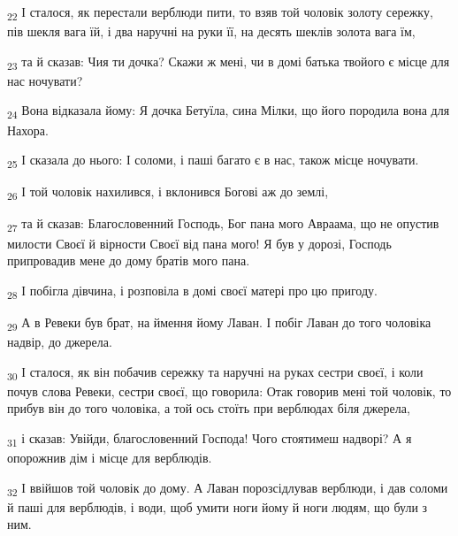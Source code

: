 \begin{tcolorbox}
\textsubscript{22} І сталося, як перестали верблюди пити, то взяв той чоловік золоту сережку, пів шекля вага їй, і два наручні на руки її, на десять шеклів золота вага їм,
\end{tcolorbox}
\begin{tcolorbox}
\textsubscript{23} та й сказав: Чия ти дочка? Скажи ж мені, чи в домі батька твойого є місце для нас ночувати?
\end{tcolorbox}
\begin{tcolorbox}
\textsubscript{24} Вона відказала йому: Я дочка Бетуїла, сина Мілки, що його породила вона для Нахора.
\end{tcolorbox}
\begin{tcolorbox}
\textsubscript{25} І сказала до нього: І соломи, і паші багато є в нас, також місце ночувати.
\end{tcolorbox}
\begin{tcolorbox}
\textsubscript{26} І той чоловік нахилився, і вклонився Богові аж до землі,
\end{tcolorbox}
\begin{tcolorbox}
\textsubscript{27} та й сказав: Благословенний Господь, Бог пана мого Авраама, що не опустив милости Своєї й вірности Своєї від пана мого! Я був у дорозі, Господь припровадив мене до дому братів мого пана.
\end{tcolorbox}
\begin{tcolorbox}
\textsubscript{28} І побігла дівчина, і розповіла в домі своєї матері про цю пригоду.
\end{tcolorbox}
\begin{tcolorbox}
\textsubscript{29} А в Ревеки був брат, на ймення йому Лаван. І побіг Лаван до того чоловіка надвір, до джерела.
\end{tcolorbox}
\begin{tcolorbox}
\textsubscript{30} І сталося, як він побачив сережку та наручні на руках сестри своєї, і коли почув слова Ревеки, сестри своєї, що говорила: Отак говорив мені той чоловік, то прибув він до того чоловіка, а той ось стоїть при верблюдах біля джерела,
\end{tcolorbox}
\begin{tcolorbox}
\textsubscript{31} і сказав: Увійди, благословенний Господа! Чого стоятимеш надворі? А я опорожнив дім і місце для верблюдів.
\end{tcolorbox}
\begin{tcolorbox}
\textsubscript{32} І ввійшов той чоловік до дому. А Лаван порозсідлував верблюди, і дав соломи й паші для верблюдів, і води, щоб умити ноги йому й ноги людям, що були з ним.
\end{tcolorbox}
